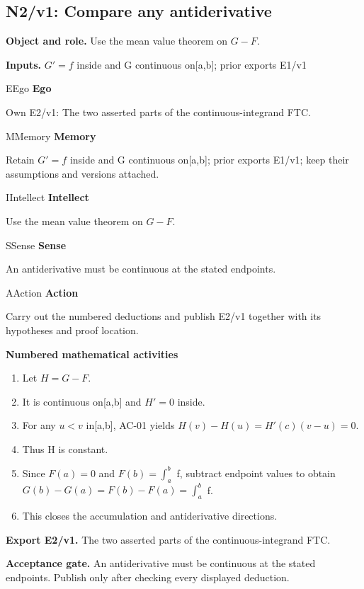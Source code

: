 \documentclass[preprint,12pt,aps,pra,showkeys,amsmath,amssymb,superscriptaddress,floatfix]{revtex4-2}
\theoremstyle{definition}
\theoremstyle{remark}
\newcommand{\mmfaculty}[3]{%
 \begin{mmfacultybox}{#1}{#2}
 {\sffamily\bfseries\color{MMBlue}#2}\par\smallskip #3
 \end{mmfacultybox}}
\newcommand{\field}[2]{\par\smallskip\noindent\textbf{#1.} #2\par}
\begin{document}
\clearpage

\subsection{N2/v1: Compare any antiderivative}

\field{Object and role}{Use the mean value theorem on \(G-F\).}

\field{Inputs}{\(G'=f\) inside and G continuous on{[}a,b{]}; prior exports E1/v1}

\mmfaculty{E}{Ego}{Own E2/v1: The two asserted parts of the continuous-integrand FTC.}

\mmfaculty{M}{Memory}{Retain \(G'=f\) inside and G continuous on{[}a,b{]}; prior exports
E1/v1; keep their assumptions and versions attached.}

\mmfaculty{I}{Intellect}{Use the mean value theorem on \(G-F\).}

\mmfaculty{S}{Sense}{An antiderivative must be continuous at the stated endpoints.}

\mmfaculty{A}{Action}{Carry out the numbered deductions and publish E2/v1 together with its
hypotheses and proof location.}

\smallskip\noindent\textbf{Numbered mathematical activities}

\begin{enumerate}[label=N2.\arabic*,leftmargin=3.4em]

\item Let \(H=G-F\).

\item It is continuous on{[}a,b{]} and \(H'=0\) inside.

\item For any \(u<v\) in{[}a,b{]}, AC-01 yields \(H(v)-H(u)=H'(c)(v-u)=0\).

\item Thus H is constant.

\item Since \(F(a)=0\) and \(F(b)=\int _a^b\) f, subtract endpoint values to
obtain \(G(b)-G(a)=F(b)-F(a)=\int _a^b\) f.

\item This closes the accumulation and antiderivative directions.

\end{enumerate}

\field{Export E2/v1}{The two asserted parts of the continuous-integrand FTC.}

\field{Acceptance gate}{An antiderivative must be continuous at the stated endpoints. Publish
only after checking every displayed deduction.}
\end{document}
